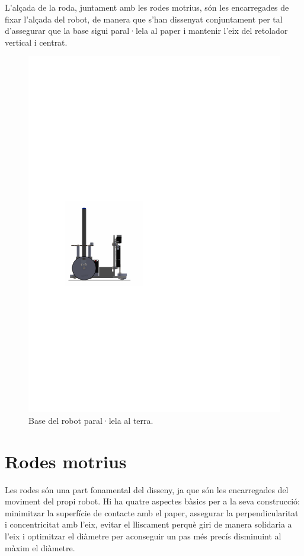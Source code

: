 L’alçada de la roda, juntament amb les rodes motrius, són les encarregades de fixar l’alçada del robot, de manera que s’han dissenyat conjuntament per tal d’assegurar que la base sigui paral·lela al paper i mantenir l’eix del retolador vertical i centrat.

\begin{figure}[H]
	\centering
	\includegraphics{pla}
	\caption{Base del robot paral·lela al terra.}
	\label{fig:pla}
\end{figure}



\section{Rodes motrius}

Les rodes són una part fonamental del disseny, ja que són les encarregades del moviment del propi robot. Hi ha quatre aspectes bàsics per a la seva construcció: minimitzar la superfície de contacte amb el paper, assegurar la perpendicularitat i concentricitat amb l’eix, evitar el lliscament perquè giri de manera solidaria a l'eix i optimitzar el diàmetre per aconseguir un pas més precís disminuint al màxim el diàmetre. 

